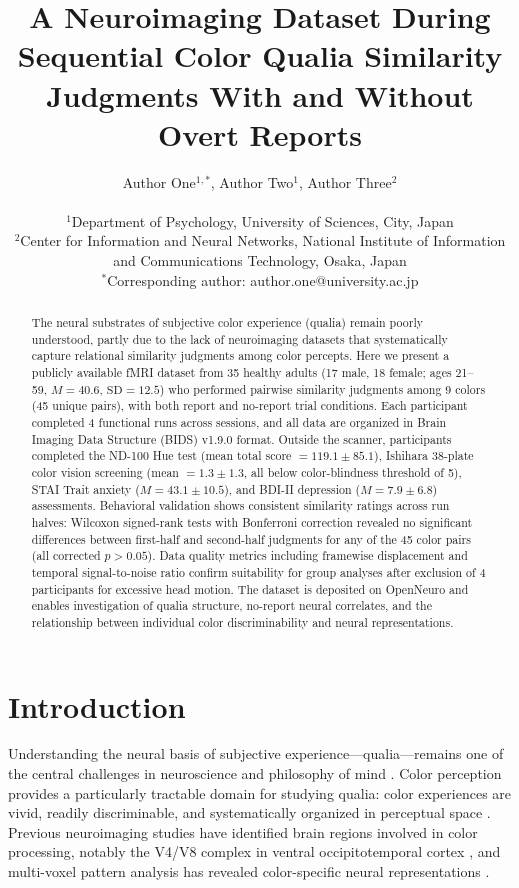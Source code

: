 \documentclass[11pt]{article}
\title{A Neuroimaging Dataset During Sequential Color Qualia Similarity Judgments With and Without Overt Reports}
\author{
Author One$^{1,*}$, Author Two$^{1}$, Author Three$^{2}$ \\
\\
$^{1}$Department of Psychology, University of Sciences, City, Japan \\
$^{2}$Center for Information and Neural Networks, National Institute of Information and Communications Technology, Osaka, Japan \\
$^{*}$Corresponding author: author.one@university.ac.jp
}
\date{}
\begin{document}
\maketitle

\begin{abstract}
The neural substrates of subjective color experience (qualia) remain poorly understood, partly due to the lack of neuroimaging datasets that systematically capture relational similarity judgments among color percepts. Here we present a publicly available fMRI dataset from 35 healthy adults (17 male, 18 female; ages 21--59, $M = 40.6$, $\text{SD} = 12.5$) who performed pairwise similarity judgments among 9 colors (45 unique pairs), with both report and no-report trial conditions. Each participant completed 4 functional runs across sessions, and all data are organized in Brain Imaging Data Structure (BIDS) v1.9.0 format. Outside the scanner, participants completed the ND-100 Hue test (mean total score $= 119.1 \pm 85.1$), Ishihara 38-plate color vision screening (mean $= 1.3 \pm 1.3$, all below color-blindness threshold of 5), STAI Trait anxiety ($M = 43.1 \pm 10.5$), and BDI-II depression ($M = 7.9 \pm 6.8$) assessments. Behavioral validation shows consistent similarity ratings across run halves: Wilcoxon signed-rank tests with Bonferroni correction revealed no significant differences between first-half and second-half judgments for any of the 45 color pairs (all corrected $p > 0.05$). Data quality metrics including framewise displacement and temporal signal-to-noise ratio confirm suitability for group analyses after exclusion of 4 participants for excessive head motion. The dataset is deposited on OpenNeuro and enables investigation of qualia structure, no-report neural correlates, and the relationship between individual color discriminability and neural representations.
\end{abstract}

\section{Introduction}

Understanding the neural basis of subjective experience---qualia---remains one of the central challenges in neuroscience and philosophy of mind \citep{koch2016, tononi2016}. Color perception provides a particularly tractable domain for studying qualia: color experiences are vivid, readily discriminable, and systematically organized in perceptual space \citep{koenderink2010, cie1964}. Previous neuroimaging studies have identified brain regions involved in color processing, notably the V4/V8 complex in ventral occipitotemporal cortex \citep{bartels2000, wandell1999}, and multi-voxel pattern analysis has revealed color-specific neural representations \citep{brouwer2009}.
\end{document}
